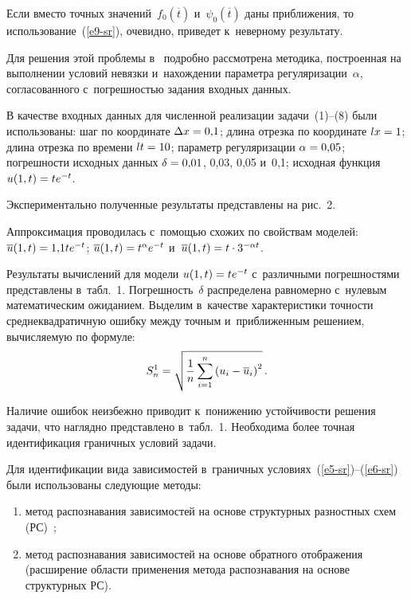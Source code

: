 \begin{multicols}{2}
  Если вместо точных значений~$f_0(\overline{t})$ и~$\psi_0(\overline{t})$ 
даны приближения, то использование~(\ref{e9-sr}), очевидно, приведет 
к~неверному результату.
  
  Для решения этой проблемы в~\cite{15-sr} подробно рассмотрена методика, 
построенная на выполнении условий невязки и~нахождении параметра 
регуляризации~$\alpha$, согласованного с~погрешностью задания входных 
данных.
  
  В качестве входных данных для численной реализации задачи~(1)--(8) были 
использованы: шаг по координате $\Delta x\hm= 0{,}1$; длина отрезка по 
координате $lx\hm=1$; длина отрезка по времени $lt\hm=10$; параметр 
регуляризации $\alpha\hm=0{,}05$; погрешности исходных данных $\delta\hm= 
0{,}01$, 0,03, 0,05 и~0,1; исходная функция $u(1,t)\hm=te^{-t}$.
  
  Экспериментально полученные результаты представлены на рис.~2.
  
  Аппроксимация проводилась с~помощью схожих по свойствам моделей: 
$\overline{u}(1,t)\hm= 1{,}1 te^{-t}$; $\overline{u}(1,t)\hm= t^\alpha e^{-t}$ 
и~$\overline{u}(1,t)\hm= t\cdot 3^{-\alpha t}$.
  



  Результаты вычислений для модели $u(1,t)\hm= te^{-t}$ с~различными 
погрешностями представлены в~табл.~1. Погрешность~$\delta$ распределена 
равномерно с~нулевым математическим ожиданием. Выделим в~качестве 
характеристики точности среднеквадратичную ошибку между точным 
и~приближенным решением, вычисляемую по формуле: 
  $$
  S_n^1 = \sqrt{\displaystyle\frac{\displaystyle 1\mathstrut}{\displaystyle n\mathstrut}\sum\limits^n_{i=1} \left( u_i -\overline{u}_i\right)^2}\,.
  $$
  

  
  Наличие ошибок неизбежно приводит к~понижению устойчивости решения 
задачи, что наглядно представлено в~табл.~1. Необходима более точная 
идентификация граничных условий задачи.
  
  Для идентификации вида зависимостей в~граничных  
условиях~(\ref{e5-sr})--(\ref{e6-sr}) были использованы следующие методы:
  \begin{enumerate}[(1)]
\item метод распознавания зависимостей на основе структурных разностных 
схем (РС)~\cite{4-sr};
\item метод распознавания зависимостей на основе обратного 
отображения~\cite{5-sr} (расширение области применения метода 
распознавания на основе структурных РС).
\end{enumerate}


\end{multicols}

